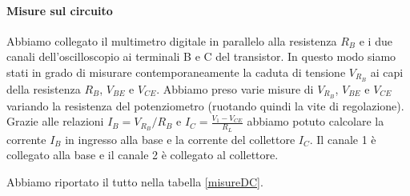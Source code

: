 \documentclass[10pt,a4paper]{article}
\begin{document}
\paragraph{Misure sul circuito}

Abbiamo collegato il multimetro digitale in parallelo alla resistenza $R_B$ e i due canali dell'oscilloscopio ai terminali B e C del transistor. In questo modo siamo stati in grado di misurare contemporaneamente la caduta di tensione $V_{R_B}$ ai capi della resistenza $R_B$, $V_{BE}$ e $V_{CE}$.
Abbiamo preso varie misure di $V_{R_B}$, $V_{BE}$ e $V_{CE}$ variando la resistenza del potenziometro (ruotando quindi la vite di regolazione). Grazie alle relazioni $I_B = V_{R_B}/R_B$ e $I_C = \frac{V_1-V_{CE}}{R_L}$ abbiamo potuto calcolare la corrente $I_B$ in ingresso alla base e la corrente del collettore $I_C$.
Il canale 1 è collegato alla base e il canale 2 è collegato al collettore.

Abbiamo riportato il tutto nella tabella \ref{misureDC}.
\end{document}
